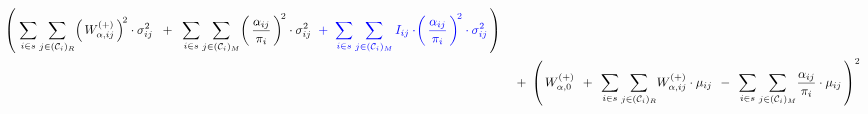 \begin{lemma}
\begin{enumerate}
\begin{eqnarray*}
        \left(\;
            \underset{i \in s}{\sum}\,
            \underset{j \in (\mathcal{C}_{i})_{R}}{\sum}\!
            \left(\,W^{(+)}_{\alpha,ij}\,\right)^{\!2}
            \cdot
            \sigma^{2}_{ij}
            \;\; + \;\;
            \underset{i \in s}{\sum}\,
            \underset{j \in (\mathcal{C}_{i})_{M}}{\sum}\!
            \left(\,
                \dfrac{ \alpha_{ij} }{ \pi_{i} }
                \,\right)^{\!2}
            \cdot
            \sigma^{2}_{ij}
            {\color{blue}
            \;\; + \;\;
            \underset{i \in s}{\sum}\,
            \underset{j \in (\mathcal{C}_{i})_{M}}{\sum}\,
            I_{ij}
            \cdot\!
            \left(\,
                \dfrac{ \alpha_{ij} }{ \pi_{i} }
                \,\right)^{\!2}
            \cdot
            \sigma_{ij}^{2}
            }
            \,\right)
    \\
    &&
        \; + \;
        \left(\,
            W^{(+)}_{\alpha,0}
            \;\, + \;\,
            \underset{i \in s}{\sum}\,
            \underset{j \in (\mathcal{C}_{i})_{R}}{\sum}
            W^{(+)}_{\alpha,ij}\cdot\mu_{ij}
            \;\,-\;\,
            \underset{i \in s}{\sum}\,
            \underset{j \in (\mathcal{C}_{i})_{M}}{\sum}
            \dfrac{ \alpha_{ij} }{ \pi_{i} }\cdot\mu_{ij}
            \,\right)^{2}
    \end{eqnarray*}
\end{enumerate}
\end{lemma}
\proof
\renewcommand{\theenumi}{\roman{enumi}}
\renewcommand{\labelenumi}{\mbox{}\;\;\,(\theenumi)$\quad$}
